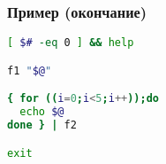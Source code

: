 \begin{frame}[fragile]
	\frametitle{Пример (окончание)}
	\small
        \begin{lstlisting}[language=bash,frame=single]
[ $# -eq 0 ] && help

f1 "$@"

{ for ((i=0;i<5;i++));do
  echo $@
done } | f2

exit
\end{lstlisting}

\end{frame}
